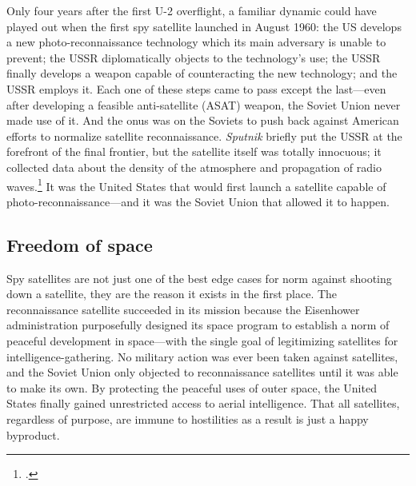 \documentclass[14pt]{extarticle}
\begin{document}
Only four years after the first U-2 overflight, a familiar dynamic could have played out when the first spy satellite launched in August 1960: the US develops a new photo-reconnaissance technology which its main adversary is unable to prevent; the USSR diplomatically objects to the technology's use; the USSR finally develops a weapon capable of counteracting the new technology; and the USSR employs it. Each one of these steps came to pass except the last---even after developing a feasible anti-satellite (ASAT) weapon, the Soviet Union never made use of it. And the onus was on the Soviets to push back against American efforts to normalize satellite reconnaissance. \emph{Sputnik} briefly put the USSR at the forefront of the final frontier, but the satellite itself was totally innocuous; it collected data about the density of the atmosphere and propagation of radio waves.\footcite{nasa_sputnik_2019} It was the United States that would first launch a satellite capable of photo-reconnaissance---and it was the Soviet Union that allowed it to happen.

\subsection{Freedom of space}
Spy satellites are not just one of the best edge cases for norm against shooting down a satellite, they are the reason it exists in the first place. The reconnaissance satellite succeeded in its mission because the Eisenhower administration purposefully designed its space program to establish a norm of peaceful development in space---with the single goal of legitimizing satellites for intelligence-gathering. No military action was ever been taken against satellites, and the Soviet Union only objected to reconnaissance satellites until it was able to make its own. By protecting the peaceful uses of outer space, the United States finally gained unrestricted access to aerial intelligence. That all satellites, regardless of purpose, are immune to hostilities as a result is just a happy byproduct.
\end{document}
